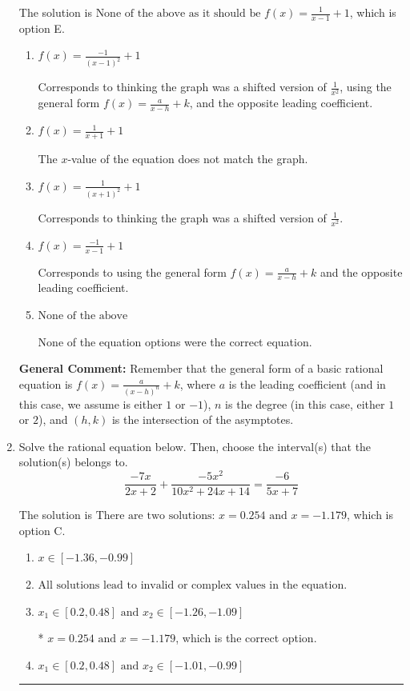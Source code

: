 \documentclass{extbook}[14pt]
\newcommand{\litem}[1]{\item #1

\rule{\textwidth}{0.4pt}}
\begin{document}
\begin{enumerate}
{The solution is \( \text{None of the above as it should be } f(x) = \frac{1}{x - 1} + 1 \), which is option E.\begin{enumerate}[label=\Alph*.]
\item \( f(x) = \frac{-1}{(x - 1)^2} + 1 \)

Corresponds to thinking the graph was a shifted version of $\frac{1}{x^2}$, using the general form $f(x) = \frac{a}{x-h}+k$, and the opposite leading coefficient.
\item \( f(x) = \frac{1}{x + 1} + 1 \)

The $x$-value of the equation does not match the graph.
\item \( f(x) = \frac{1}{(x + 1)^2} + 1 \)

Corresponds to thinking the graph was a shifted version of $\frac{1}{x^2}$.
\item \( f(x) = \frac{-1}{x - 1} + 1 \)

Corresponds to using the general form $f(x) = \frac{a}{x-h}+k$ and the opposite leading coefficient.
\item \( \text{None of the above} \)

None of the equation options were the correct equation.
\end{enumerate}

\textbf{General Comment:} Remember that the general form of a basic rational equation is $ f(x) = \frac{a}{(x-h)^n} + k$, where $a$ is the leading coefficient (and in this case, we assume is either $1$ or $-1$), $n$ is the degree (in this case, either $1$ or $2$), and $(h, k)$ is the intersection of the asymptotes.
}
\litem{
Solve the rational equation below. Then, choose the interval(s) that the solution(s) belongs to.
\[ \frac{-7x}{2x + 2} + \frac{-5x^{2}}{10x^{2} +24 x + 14} = \frac{-6}{5x + 7} \]

The solution is \( \text{There are two solutions: } x = 0.254 \text{ and } x = -1.179 \), which is option C.\begin{enumerate}[label=\Alph*.]
\item \( x \in [-1.36,-0.99] \)


\item \( \text{All solutions lead to invalid or complex values in the equation.} \)


\item \( x_1 \in [0.2, 0.48] \text{ and } x_2 \in [-1.26,-1.09] \)

* $x = 0.254 \text{ and } x = -1.179$, which is the correct option.
\item \( x_1 \in [0.2, 0.48] \text{ and } x_2 \in [-1.01,-0.99] \)



\end{enumerate}}
\end{enumerate}
\end{document}

